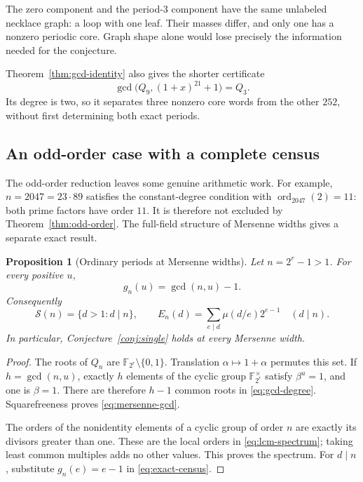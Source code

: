 \documentclass[11pt]{article}
\newtheorem{proposition}[theorem]{Proposition}
\theoremstyle{definition}
\theoremstyle{remark}
\numberwithin{equation}{section}
\newcommand{\Spec}{\mathcal S}
\DeclareMathOperator{\ord}{ord}
\begin{document}
The zero component and the period-$3$ component have the same unlabeled
necklace graph: a loop with one leaf. Their masses differ, and only one
has a nonzero periodic core. Graph shape alone would lose precisely the
information needed for the conjecture.

Theorem~\ref{thm:gcd-identity} also gives the shorter certificate
\[
 \gcd\bigl(Q_9,(1+x)^{21}+1\bigr)=Q_3.
\]
Its degree is two, so it separates three nonzero core words from the
other $252$, without first determining both exact periods.

\subsection{An odd-order case with a complete census}\label{sec:mersenne}

The odd-order reduction leaves some genuine arithmetic work. For example,
$n=2047=23\cdot89$ satisfies the constant-degree condition with
$\ord_{2047}(2)=11$: both prime factors have order $11$. It is therefore
not excluded by Theorem~\ref{thm:odd-order}. The full-field structure of
Mersenne widths gives a separate exact result.

\begin{proposition}[Ordinary periods at Mersenne widths]\label{prop:mersenne}
Let $n=2^r-1>1$. For every positive $u$,
\begin{equation}\label{eq:mersenne-gcd}
 g_n(u)=\gcd(n,u)-1.
\end{equation}
Consequently
\begin{equation}\label{eq:mersenne-spectrum}
 \Spec(n)=\{d>1:d\mid n\},
 \qquad E_n(d)=\sum_{e\mid d}\mu(d/e)2^{e-1}
 \quad(d\mid n).
\end{equation}
In particular, Conjecture~\ref{conj:single} holds at every Mersenne width.
\end{proposition}

\begin{proof}
The roots of $Q_n$ are $\mathbb F_{2^r}\setminus\{0,1\}$.
Translation $\alpha\mapsto1+\alpha$ permutes this set. If
$h=\gcd(n,u)$, exactly $h$ elements of the cyclic group
$\mathbb F_{2^r}^\times$ satisfy $\beta^u=1$, and one is $\beta=1$.
There are therefore $h-1$ common roots in \eqref{eq:gcd-degree}.
Squarefreeness proves \eqref{eq:mersenne-gcd}.

The orders of the nonidentity elements of a cyclic group of order $n$
are exactly its divisors greater than one. These are the local orders
in \eqref{eq:lcm-spectrum}; taking least common multiples adds no other
values. This proves the spectrum. For $d\mid n$, substitute
$g_n(e)=e-1$ in \eqref{eq:exact-census}.
\end{proof}
\end{document}
